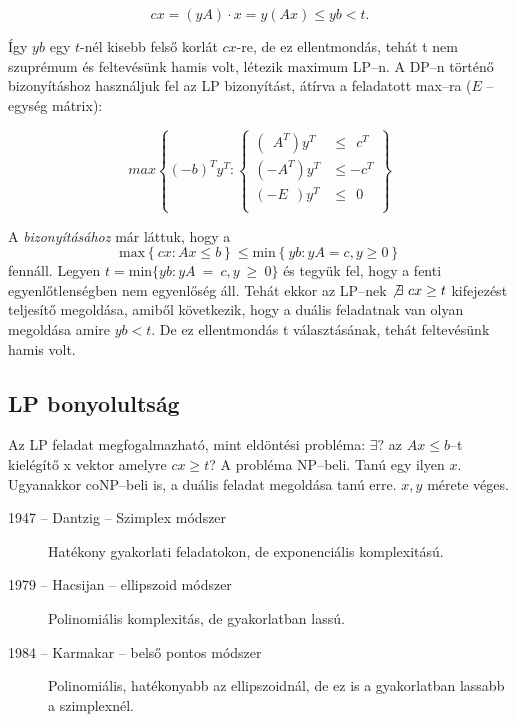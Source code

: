 \[ cx = (yA)\cdot x = y (Ax) \leq yb < t.\]

Így $yb$ egy $t$-nél kisebb felső korlát $cx$-re, de ez ellentmondás, tehát t
nem szuprémum és feltevésünk hamis volt, létezik maximum LP--n. A DP--n történő
bizonyításhoz használjuk fel az LP bizonyítást, átírva a feladatott max--ra ($E$
-- egység mátrix):

\[ max \left\{ (-b)^T y^T :
\begin{cases}
(~~A^T)y^T    &\leq~~c^T \\
(-A^T) y^T &\leq -c^T \\
(-E~~)y^T    &\leq~~0 \\
\end{cases}  \right\} \]
 
A  \emph{bizonyításához} már láttuk, hogy a \[ \mbox{max}\left\{
cx:Ax \leq b \right\} \leq
   \mbox{min}\left\{ yb:yA = c, y \geq 0 \right\}
\] fennáll. Legyen $t=\mbox{min}\{ yb:yA~=~c, y~\geq~0 \}$ és tegyük fel, hogy a
fenti egyenlőtlenségben nem egyenlőség áll.  Tehát ekkor az LP--nek
$\not\exists~cx \geq t$ kifejezést teljesítő megoldása, amiből következik,
hogy a duális feladatnak van olyan megoldása amire $yb<t$. De ez ellentmondás t
választásának, tehát feltevésünk hamis volt.

\subsection{LP bonyolultság}

Az LP feladat megfogalmazható, mint eldöntési probléma: $\exists?$ az $Ax \leq
b$--t kielégítő x vektor amelyre $cx\geq t$? A probléma NP--beli. Tanú egy ilyen
$x$. Ugyanakkor coNP--beli is, a duális feladat megoldása tanú erre. $x, y$
mérete véges.

\begin{description}
  \item[1947 -- Dantzig -- Szimplex módszer] Hatékony gyakorlati feladatokon, de
  exponenciális komplexitású.
  \item[1979 --  Hacsijan -- ellipszoid módszer] Polinomiális komplexitás, de
  gyakorlatban lassú.
  \item[1984 --  Karmakar -- belső pontos módszer]  Polinomiális, hatékonyabb az
  ellipszoidnál, de ez is a gyakorlatban lassabb a szimplexnél.
\end{description}